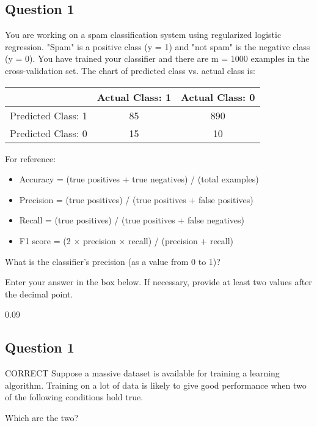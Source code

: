 \documentclass[11pt]{article} %
\begin{document}
\subsection*{Question 1} 
You are working on a spam classification system using regularized logistic regression. "Spam" is a positive class (y = 1) and "not spam" is the negative class (y = 0). You have trained your classifier and there are m = 1000 examples in the cross-validation set. The chart of predicted class vs. actual class is:

\begin{center}
\begin{tabular}{|c|c|c|}\hline 
	& Actual Class: 1	& Actual Class: 0 \\ \hline
	Predicted Class: 1 &	85&	890 \\  \hline  
	Predicted Class: 0 &	15&	10\\ \hline
\end{tabular} 
\end{center}


\begin{framed}
For reference:

\begin{itemize}
	\item Accuracy = (true positives + true negatives) / (total examples)
	\item Precision = (true positives) / (true positives + false positives)
	\item Recall = (true positives) / (true positives + false negatives)
	\item F1 score = (2 $\times$ precision $\times$ recall) / (precision + recall)
\end{itemize}

\end{framed}
What is the classifier's precision (as a value from 0 to 1)?

Enter your answer in the box below. If necessary, provide at least two values after the decimal point.

0.09
\subsection{Question 1} 
CORRECT
Suppose a massive dataset is available for training a learning algorithm. Training on a lot of data is likely to give good performance when two of the following conditions hold true.

Which are the two?
\end{document}
